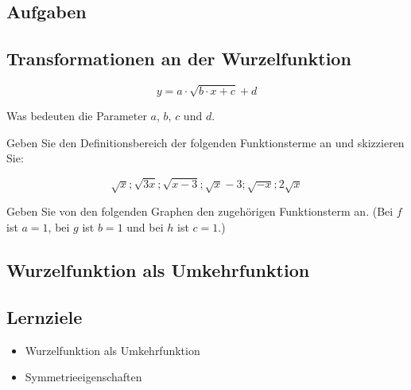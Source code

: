 \subsection*{Aufgaben}



\newpage

\subsection{Transformationen an der Wurzelfunktion}

$$y = a\cdot{} \sqrt{b\cdot{}x + c} + d$$

Was bedeuten die Parameter $a$, $b$, $c$ und $d$.

Geben Sie den Definitionsbereich der folgenden Funktionsterme an und skizzieren Sie:

$$\sqrt{x}; \sqrt{3x}; \sqrt{x-3}; \sqrt{x} - 3;
\sqrt{-x}; 2\sqrt{x}$$


Geben Sie von den folgenden Graphen den zugehörigen Funktionsterm
an. (Bei $f$ ist $a=1$, bei $g$ ist $b=1$ und bei $h$ ist $c=1$.)


\newpage

\subsection{Wurzelfunktion als Umkehrfunktion}

\subsection*{Lernziele}

\begin{itemize}
\item Wurzelfunktion als Umkehrfunktion
\item Symmetrieeigenschaften
\end{itemize}

\newpage

